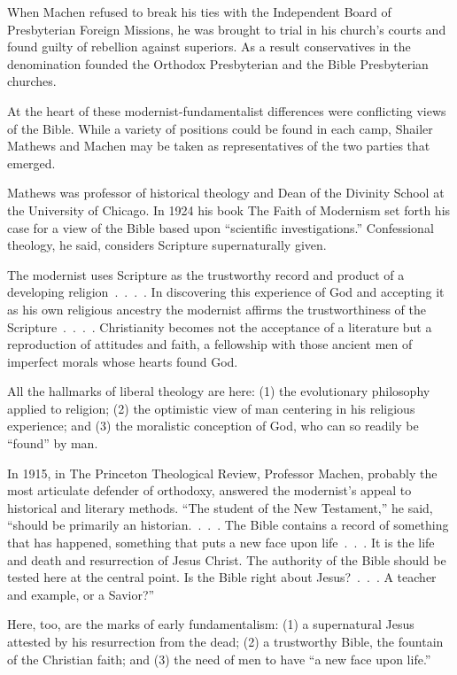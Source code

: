 When Machen refused to break his ties with the Independent Board of Presbyterian Foreign Missions,
he was brought to trial in his church’s courts and found guilty of rebellion against superiors. As a
result conservatives in the denomination founded the Orthodox Presbyterian and the Bible
Presbyterian churches.

At the heart of these modernist-fundamentalist differences were conflicting views of the Bible.
While a variety of positions could be found in each camp, Shailer Mathews and Machen may be taken as
representatives of the two parties that emerged.

Mathews was professor of historical theology and Dean of the Divinity School at the University of
Chicago. In 1924 his book The Faith of Modernism set forth his case for a view of the Bible based
upon “scientific investigations.” Confessional theology, he said, considers Scripture supernaturally
given.

\begin{blockquote}
The modernist uses Scripture as the trustworthy record and product of a developing religion~.~.~.~.
In discovering this experience of God and accepting it as his own religious ancestry the modernist
affirms the trustworthiness of the Scripture~.~.~.~. Christianity becomes not the acceptance of a
literature but a reproduction of attitudes and faith, a fellowship with those ancient men of
imperfect morals whose hearts found God.
\end{blockquote}

All the hallmarks of liberal theology are here: (1) the evolutionary philosophy applied to religion;
(2) the optimistic view of man centering in his religious experience; and (3) the moralistic
conception of God, who can so readily be “found” by man.

In 1915, in The Princeton Theological Review, Professor Machen, probably the most articulate
defender of orthodoxy, answered the modernist’s appeal to historical and literary methods. “The
student of the New Testament,” he said, “should be primarily an historian.~.~.~. The Bible contains
a record of something that has happened, something that puts a new face upon life~.~.~. It is the
life and death and resurrection of Jesus Christ. The authority of the Bible should be tested here at
the central point. Is the Bible right about Jesus?~.~.~. A teacher and example, or a Savior?”

Here, too, are the marks of early fundamentalism: (1) a supernatural Jesus attested by his
resurrection from the dead; (2) a trustworthy Bible, the fountain of the Christian faith; and (3)
the need of men to have “a new face upon life.”

